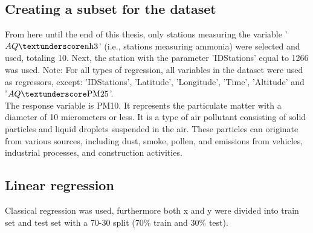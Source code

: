 \subsection{Creating a subset for the dataset}
From here until the end of this thesis, only stations measuring the variable '$AQ\textunderscore\text{nh}{3}$' (i.e., stations measuring ammonia) were selected and used, totaling 10. Next, the station with the parameter 'IDStations' equal to 1266 was used. 
Note: For all types of regression, all variables in the dataset were used as regressors, except: 'IDStations', 'Latitude', 'Longitude', 'Time', 'Altitude' and '$AQ\textunderscore\text{PM}{25}$'.
\\The response variable is PM10. It represents the particulate matter with a diameter of 10 micrometers or less. It is a type of air pollutant consisting of solid particles and liquid droplets suspended in the air. These particles can originate from various sources, including dust, smoke, pollen, and emissions from vehicles, industrial processes, and construction activities.

\subsection{Linear regression}
Classical regression was used, furthermore both x and y were divided into train set and test set with a 70-30 split (70$\%$ train and 30$\%$ test).
